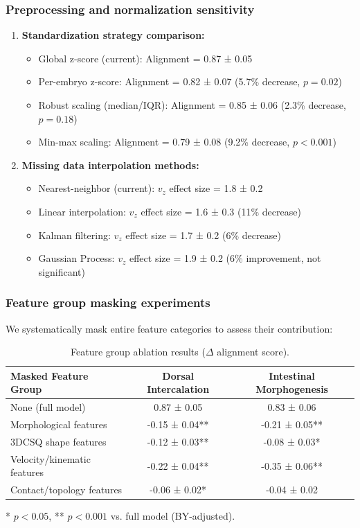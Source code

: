 \documentclass[unnumsec,webpdf,modern,large,namedate]{oup-authoring-template}%
\theoremstyle{thmstyleone}\newtheorem{theorem}{Theorem}
\theoremstyle{thmstyletwo}\newtheorem{example}{Example}
\theoremstyle{thmstylethree}\newtheorem{definition}{Definition}
\begin{document}
\subsubsection{Preprocessing and normalization sensitivity}
\begin{enumerate}
\item \textbf{Standardization strategy comparison:}
\begin{itemize}
    \item Global z-score (current): Alignment = 0.87 ± 0.05
    \item Per-embryo z-score: Alignment = 0.82 ± 0.07 (5.7\% decrease, $p = 0.02$)
    \item Robust scaling (median/IQR): Alignment = 0.85 ± 0.06 (2.3\% decrease, $p = 0.18$)
    \item Min-max scaling: Alignment = 0.79 ± 0.08 (9.2\% decrease, $p < 0.001$)
\end{itemize}

\item \textbf{Missing data interpolation methods:}
\begin{itemize}
    \item Nearest-neighbor (current): $v_z$ effect size = 1.8 ± 0.2
    \item Linear interpolation: $v_z$ effect size = 1.6 ± 0.3 (11\% decrease)
    \item Kalman filtering: $v_z$ effect size = 1.7 ± 0.2 (6\% decrease)
    \item Gaussian Process: $v_z$ effect size = 1.9 ± 0.2 (6\% improvement, not significant)
\end{itemize}
\end{enumerate}

\subsubsection{Feature group masking experiments}
We systematically mask entire feature categories to assess their contribution:
\begin{table}[h]
\centering
\caption{Feature group ablation results ($\Delta$ alignment score).}
\label{tab:feature_ablation}
\begin{tabular}{lcc}
\toprule
\textbf{Masked Feature Group} & \textbf{Dorsal Intercalation} & \textbf{Intestinal Morphogenesis} \\
\midrule
None (full model) & 0.87 ± 0.05 & 0.83 ± 0.06 \\
Morphological features & -0.15 ± 0.04** & -0.21 ± 0.05** \\
3DCSQ shape features & -0.12 ± 0.03** & -0.08 ± 0.03* \\
Velocity/kinematic features & -0.22 ± 0.04** & -0.35 ± 0.06** \\
Contact/topology features & -0.06 ± 0.02* & -0.04 ± 0.02 \\
\bottomrule
\end{tabular}
\begin{tablenotes}
* $p < 0.05$, ** $p < 0.001$ vs. full model (BY-adjusted).
\end{tablenotes}
\end{table}
\end{document}
